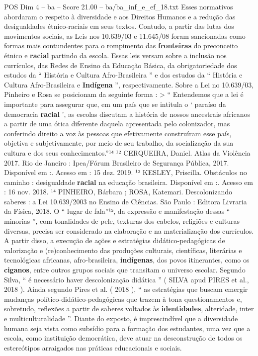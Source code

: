 \begin{textsample}{POS Dim 4 – ba – Score 21.00 – ba/ba\_inf\_e\_ef\_18.txt}
Esses normativos abordaram o respeito à diversidade e aos Direitos Humanos e a redução das desigualdades étnico-raciais em seus textos.
Contudo, a partir das lutas dos movimentos sociais, as Leis nos 10.639/03 e 11.645/08 foram sancionadas como formas mais contundentes para o rompimento das \textbf{fronteiras} do preconceito étnico e \textbf{racial} partindo da escola.
Essas leis versam sobre a inclusão nos currículos, das Redes de Ensino da Educação Básica, da obrigatoriedade dos estudos da “ História e Cultura Afro-Brasileira ” e dos estudos da “ História e Cultura Afro-Brasileira e \textbf{Indígena} ”, respectivamente.
Sobre a Lei no 10.639/03, Pinheiro e Rosa se posicionam da seguinte forma : > “ Entendemos que a lei é importante para assegurar que, em um país que se intitula o ‘ paraíso da democracia \textbf{racial} ’, as escolas discutam a história de nossos ancestrais africanos a partir de uma ótica diferente daquela apresentada pelo colonizador, mas conferindo direito a voz às pessoas que efetivamente construíram esse país, objetiva e subjetivamente, por meio de seu trabalho, da socialização da sua cultura e dos seus conhecimentos.”¹⁴ ¹² CERQUEIRA, Daniel.
Atlas da Violência 2017.
Rio de Janeiro : Ipea/Fórum Brasileiro de Segurança Pública, 2017.
Disponível em :.
Acesso em : 15 dez. 2019. ¹³ KESLEY, Priscilla.
Obstáculos no caminho : desigualdade \textbf{racial} na educação brasileira.
Disponível em :.
Acesso em : 16 nov. 2018. ¹⁴ PINHEIRO, Bárbara ; ROSA, Katemari.
Descolonizando saberes : a Lei 10.639/2003 no Ensino de Ciências.
São Paulo : Editora Livraria da Física, 2018.
O “ lugar de fala”¹⁵, da expressão e manifestação dessas “ minorias ”, com tonalidades de pele, texturas dos cabelos, religiões e culturas diversas, precisa ser considerado na elaboração e na materialização dos currículos.
A partir disso, a execução de ações e estratégias didático-pedagógicas de valorização e (re)conhecimento das produções culturais, científicas, literárias e tecnológicas africanas, afro-brasileira, \textbf{indígenas}, dos povos itinerantes, como os \textbf{ciganos}, entre outros grupos sociais que transitam o universo escolar.
Segundo Silva, “ é necessário haver descolonização didática ” ( SILVA apud PIRES et al., 2018 ).
Ainda segundo Pires et al. ( 2018 ), “ as estratégias que buscam emergir mudanças político-didático-pedagógicas que trazem à tona questionamentos e, sobretudo, reflexões a partir de saberes voltados às \textbf{identidades}, alteridade, inter e multiculturalidade ”.
Diante do exposto, é imprescindível que a diversidade humana seja vista como subsídio para a formação dos estudantes, uma vez que a escola, como instituição democrática, deve atuar na desconstrução de todos os estereótipos arraigados nas práticas educacionais e sociais.

\end{textsample}
